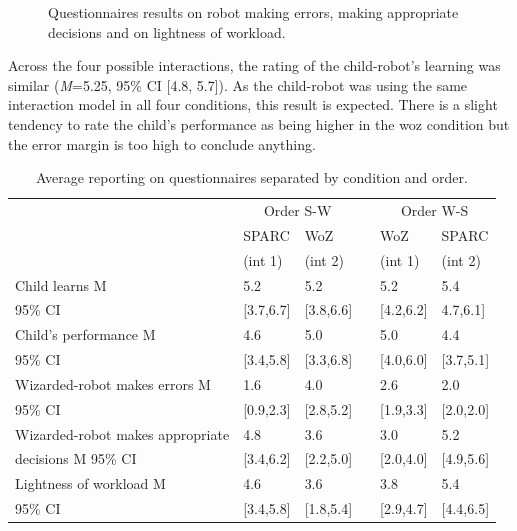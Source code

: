 \begin{figure}[ht]
\begin{subfigure}[t]{0.3295\textwidth}
	\end{subfigure}
	\caption{Questionnaires results on robot making errors, making appropriate decisions and on lightness of workload.}
	\label{fig:woz_quest}
\end{figure}

Across the four possible interactions, the rating of the child-robot's learning was similar (\textit{M}=5.25, 95\% CI [4.8, 5.7]). As the child-robot was using the same interaction model in all four conditions, this result is expected. There is a slight tendency to rate the child's performance as being higher in the \gls{woz} condition but the error margin is too high to conclude anything. %

\begin{table}[t]
	\caption{Average reporting on questionnaires separated by condition and order.}
	\centering
\begin{tabular}{@{}lllcll@{}}\toprule
	& \multicolumn{2}{c}{Order S-W} & \phantom{abc} & \multicolumn{2}{c}{Order W-S} \\
	\cmidrule{2-3} \cmidrule{5-6}
	& SPARC & WoZ && WoZ & SPARC \\
	& (int 1) & (int 2) && (int 1) & (int 2) \\
	\midrule					
		Child learns M & 5.2 & 5.2 && 5.2 & 5.4 \\
		95\% CI & [3.7,6.7] & [3.8,6.6] &&  [4.2,6.2] & 4.7,6.1]\\[.2cm]
		Child's performance M & 4.6 & 5.0 && 5.0 & 4.4 \\
		95\% CI & [3.4,5.8] & [3.3,6.8] && [4.0,6.0] & [3.7,5.1]\\[.2cm]
		Wizarded-robot makes errors M & 1.6 & 4.0 && 2.6 & 2.0 \\
		95\% CI & [0.9,2.3] & [2.8,5.2] && [1.9,3.3] & [2.0,2.0] \\[.2cm]
		Wizarded-robot makes appropriate & 4.8 & 3.6 && 3.0  & 5.2 \\
		decisions M 95\% CI & [3.4,6.2] & [2.2,5.0] && [2.0,4.0] & [4.9,5.6] \\ [.2cm]
		Lightness of workload M & 4.6  & 3.6 && 3.8  & 5.4 \\
		95\% CI & [3.4,5.8] & [1.8,5.4] && [2.9,4.7] & [4.4,6.5] \\
		\bottomrule
	\end{tabular}
	\label{tab:woz_quest_means}
\end{table}

